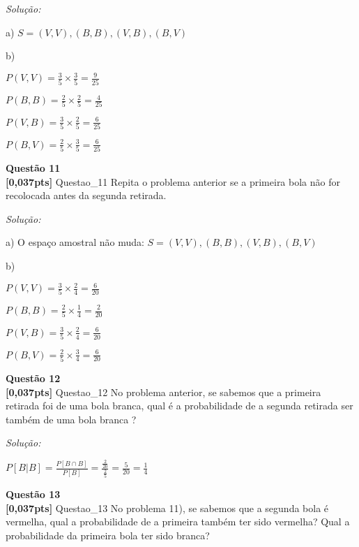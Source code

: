 \documentclass{article}
\newenvironment{problem}[2][Questão]
    { \begin{mdframed}[backgroundcolor=gray!20] \textbf{#1 #2} \\}
    {  \end{mdframed}}
\newenvironment{solution}
    {\textit{Solução:}}
    {}
\begin{document}
\begin{solution}

a) $S = {(V,V), (B,B), (V,B), (B,V)}$

b)

$P(V,V) = \frac{3}{5} \times \frac{3}{5} = \frac{9}{25}$

$P(B,B) = \frac{2}{5} \times \frac{2}{5} = \frac{4}{25}$

$P(V,B) = \frac{3}{5} \times \frac{2}{5} = \frac{6}{25}$

$P(B,V) = \frac{2}{5} \times \frac{3}{5} = \frac{6}{25}$

\end{solution}

\begin{problem}{11}
\textbf{[0,037pts]} Questao\_11 Repita o problema anterior se a primeira bola não for recolocada antes da segunda retirada.


\end{problem}

\begin{solution}

a) O espaço amostral não muda: $S = {(V,V), (B,B), (V,B), (B,V)}$

b)

$P(V,V) = \frac{3}{5} \times \frac{2}{4} = \frac{6}{20}$

$P(B,B) = \frac{2}{5} \times \frac{1}{4} = \frac{2}{20}$

$P(V,B) = \frac{3}{5} \times \frac{2}{4} = \frac{6}{20}$

$P(B,V) = \frac{2}{5} \times \frac{3}{4} = \frac{6}{20}$


\end{solution}

\begin{problem}{12}
\textbf{[0,037pts]} Questao\_12 No problema anterior, se sabemos que a primeira retirada foi de uma bola branca, qual é a probabilidade de a segunda retirada ser também de uma bola branca ?
\end{problem}

\begin{solution}

$P[B|B] = \frac{P[B \cap B]}{P[B]} = \frac{\frac{2}{20}}{\frac{2}{5}} = \frac{5}{20} = \frac{1}{4}$

\end{solution}

\begin{problem}{13}
\textbf{[0,037pts]} Questao\_13 No  problema  11),  se  sabemos  que  a  segunda  bola  é  vermelha,  qual  a  probabilidade  de  a primeira também ter sido vermelha? Qual a probabilidade da primeira bola ter sido branca?
\end{problem}
\end{document}
